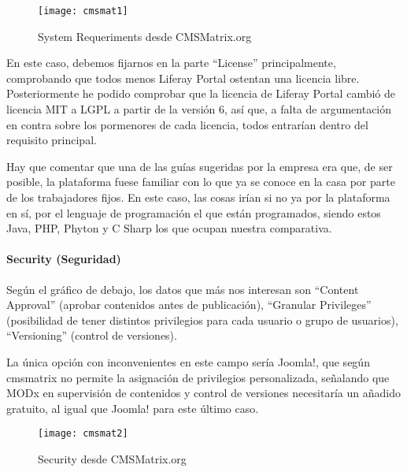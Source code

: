 \begin{figure}
\begin{narrow}{-0.12\linewidth}{-0.12\linewidth}
\centering
\texttt{[image: cmsmat1]}
\caption{System Requeriments desde CMSMatrix.org}
\end{narrow}
\label{fig:cmsmat1}
\end{figure}

\par En este caso, debemos fijarnos en la parte ``License'' principalmente, comprobando que todos menos Liferay Portal ostentan una licencia libre. Posteriormente he podido comprobar que la licencia de Liferay Portal cambió de licencia MIT a LGPL a partir de la versión 6\cite{references:liferaylicense}, así que, a falta de argumentación en contra sobre los pormenores de cada licencia, todos entrarían dentro del requisito principal.

\par Hay que comentar que una de las guías sugeridas por la empresa era que, de ser posible, la plataforma fuese familiar con lo que ya se conoce en la casa por parte de los trabajadores fijos. En este caso, las cosas irían si no ya por la plataforma en sí, por el lenguaje de programación el que están programados, siendo estos Java, PHP, Phyton y C Sharp los que ocupan nuestra comparativa.

\paragraph{Security (Seguridad)}

\par Según el gráfico de debajo, los datos que más nos interesan son ``Content Approval'' (aprobar contenidos antes de publicación), ``Granular Privileges'' (posibilidad de tener distintos privilegios para cada usuario o grupo de usuarios), ``Versioning'' (control de versiones).

\par La única opción con inconvenientes en este campo sería Joomla!, que según cmsmatrix no permite la asignación de privilegios personalizada, señalando que MODx en supervisión de contenidos y control de versiones necesitaría un añadido gratuito, al igual que Joomla! para este último caso.

\begin{figure}
\begin{narrow}{-0.12\linewidth}{-0.12\linewidth}
\centering
\texttt{[image: cmsmat2]}
\caption{Security desde CMSMatrix.org}
\end{narrow}
\label{fig:cmsmat2}
\end{figure}

